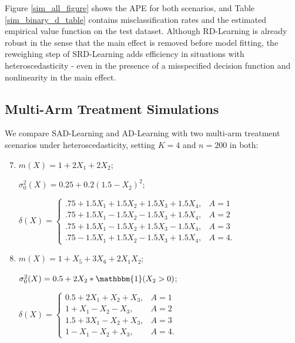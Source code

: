 \documentclass[useAMS,usenatbib]{biom}
\begin{document}
Figure \ref{sim_all_figure} shows the APE for both scenarios, and Table \ref{sim_binary_d_table} contains misclassification rates and the estimated empirical value function on the test dataset. Although RD-Learning is already robust in the sense that the main effect is removed before model fitting, the reweighing step of SRD-Learning adds efficiency in situations with heteroscedasticity - even in the presence of a misspecified decision function and nonlinearity in the main effect.

\subsection{Multi-Arm Treatment Simulations} \label{subsec_simulations_multi}

We compare SAD-Learning and AD-Learning with two multi-arm treatment scenarios under heteroscedasticity, setting $K=4$ and $n=200$ in both:

\begin{enumerate}
\setcounter{enumi}{6}
    \item $m(X) = 1 + 2X_1 + 2X_2$; 
    
    \noindent $\sigma_0^2(X) = 0.25 + 0.2(1.5 - X_2)^2$;
    
    \noindent $\delta(X) = 
    \begin{cases} 
      .75 + 1.5X_1 + 1.5X_2 + 1.5X_3 + 1.5X_4, & A = 1 \\
      .75 + 1.5X_1 - 1.5X_2 - 1.5X_3 + 1.5X_4, & A = 2 \\
      .75 + 1.5X_1 - 1.5X_2 + 1.5X_3 - 1.5X_4, & A = 3 \\
      .75 - 1.5X_1 + 1.5X_2 - 1.5X_3 + 1.5X_4, & A = 4.
   \end{cases}$ \newline
   \item $m(X) = 1 + X_5 + 3X_6 + 2X_1X_2$; 
   
   \noindent $\sigma_0^2(X) = 0.5 + 2X_2*\mathbbm{1}(X_2 > 0)$;
   
   \noindent $\delta(X) = 
    \begin{cases} 
      0.5 + 2X_1 + X_2 + X_3, & A = 1 \\
      1 + X_1 - X_2 - X_3, & A = 2 \\
      1.5 + 3X_1 - X_2 + X_3, & A = 3 \\
      1 - X_1 - X_2 + X_3, & A = 4.
   \end{cases}$
\end{enumerate}
\end{document}
